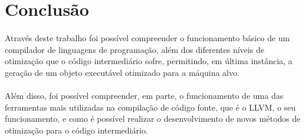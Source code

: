 \documentclass[12pt]{article}
\begin{document}
\section{Conclusão}

\paragraph{}Através deste trabalho foi possível compreender o funcionamento básico de um compilador de linguagens de programação, além dos diferentes níveis de otimização que o código intermediário sofre, permitindo, em última instância, a geração de um objeto executável otimizado para a máquina alvo.

\paragraph{}Além disso, foi possível compreender, em parte, o funcionamento de uma das ferramentas mais utilizadas na compilação de código fonte, que é o LLVM, o seu funcionamento, e como é possível realizar o desenvolvimento de novos métodos de otimização para o código intermediário.
\end{document}
